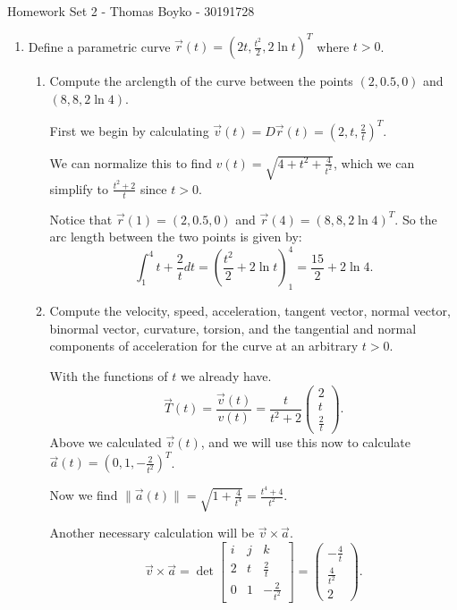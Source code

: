 \documentclass{article}
\begin{document}
    \huge Homework Set 2 - Thomas Boyko - 30191728
    \normalsize
\begin{enumerate} 
\item Define a parametric curve $\vec r(t) = (2t, \frac{t^2}{2}, 2 \ln t)^{T}$ where $t > 0$.
    \begin{enumerate}[label= (\alph*)] 
        \item Compute the arclength of the curve between the points $(2, 0.5, 0)$ and
        $(8, 8, 2 \ln 4)$.

        First we begin by calculating $\vec{v}(t)=D\vec{r}(t)=(2,t,\frac{2}{t})^{T}$.

        We can normalize this to find $v(t)=\sqrt{4+t^2+\frac{4}{t^2}}$, which we can simplify to 
        $\frac{t^2+2}{t}$ since $t>0$.

        Notice that $\vec{r}(1)=(2,0.5,0)$ and $\vec{r}(4)=(8,8,2\ln 4)^{T}$.
        So the arc length between the two points is given by:
        \[
        \int_{1}^{4} t+\frac{2}{t} dt=\left(\frac{t^2}{2}+2\ln t \right)_1^{4}=\frac{15}{2}+2\ln 4
        .\] 

        \item Compute the velocity, speed, acceleration, tangent vector, normal vector, binormal vector,
        curvature, torsion, and the tangential and normal components of acceleration for the curve at
        an arbitrary $t > 0$.

        With the functions of $t$ we already have.
        \[
        \vec{T}(t)=\frac{\vec{v}(t)}{v(t)}=\frac{t}{t^2+2}
        \begin{pmatrix} 2 \\t\\\frac{2}{t}\end{pmatrix} 
        .\] 
        Above we calculated $\vec{v}(t)$, and we will use this now to calculate 
        $\vec{a}(t)=(0,1,-\frac{2}{t^{2}})^{T}$.

        Now we find $\|\vec a(t)\|=\sqrt{1+\frac{4}{t^4}} = \frac{t^4+4}{t^2}$.

        Another necessary calculation will be $\vec{v}\times \vec{a}$.
        \[
            \vec{v}\times \vec{a}=
            \det\begin{bmatrix} 
                i&j&k\\
                2&t&\frac{2}{t}\\
                0&1&-\frac{2}{t^2}
            \end{bmatrix} 
            =\begin{pmatrix} 
                -\frac{4}{t}\\
                \frac{4}{t^2}\\
                2
            \end{pmatrix} 
        .\] 


\end{enumerate}
\end{enumerate}
\end{document}

